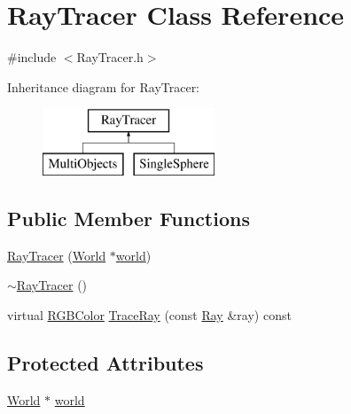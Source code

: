 \hypertarget{class_ray_tracer}{\section{Ray\-Tracer Class Reference}
\label{class_ray_tracer}
}


{\ttfamily \#include $<$Ray\-Tracer.\-h$>$}

Inheritance diagram for Ray\-Tracer\-:\begin{figure}[H]
\begin{center}
\leavevmode
\includegraphics[height=2.000000cm]{class_ray_tracer}
\end{center}
\end{figure}
\subsection*{Public Member Functions}
\begin{DoxyCompactItemize}
\item 
\hyperlink{class_ray_tracer_ad4b0fe2986e8ba61659ab72d8d1e663e}{Ray\-Tracer} (\hyperlink{class_world}{World} $\ast$\hyperlink{class_ray_tracer_a0f6b1f71e4ba4aa387c8bffe0b916c1b}{world})
\item 
\hyperlink{class_ray_tracer_ab5b30fead4f47d46be62bddb4a5283e6}{$\sim$\-Ray\-Tracer} ()
\item 
virtual \hyperlink{class_r_g_b_color}{R\-G\-B\-Color} \hyperlink{class_ray_tracer_a7c884ab374008f3384f18cd6ee328d25}{Trace\-Ray} (const \hyperlink{class_ray}{Ray} \&ray) const 
\end{DoxyCompactItemize}
\subsection*{Protected Attributes}
\begin{DoxyCompactItemize}
\item 
\hyperlink{class_world}{World} $\ast$ \hyperlink{class_ray_tracer_a0f6b1f71e4ba4aa387c8bffe0b916c1b}{world}
\end{DoxyCompactItemize}


